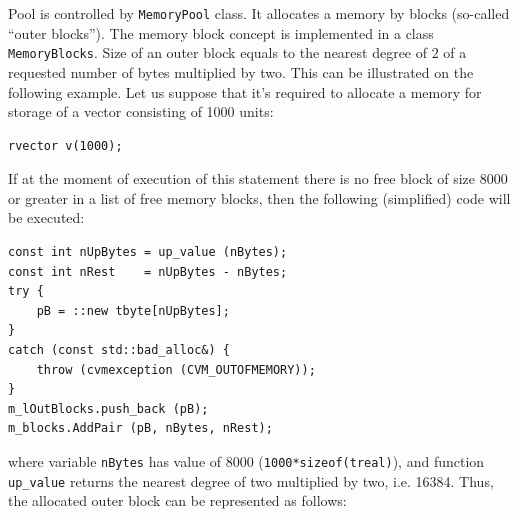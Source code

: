 Pool is controlled by \verb"MemoryPool" class. It allocates a memory
by blocks (so-called ``outer blocks'').
The memory block concept is implemented in a class
\verb"MemoryBlocks". Size of an outer block equals to the nearest
degree of $2$ of a requested number of bytes multiplied by two. This
can be illustrated on the following example. Let us suppose that it's
required to allocate a memory for storage of a vector consisting
of 1000 units:
\begin{Verbatim}
rvector v(1000);
\end{Verbatim}
If at the moment of execution of this statement there is no free
block of size 8000 or greater in a list of free memory blocks, then
the following (simplified) code will be executed:
\begin{Verbatim}
const int nUpBytes = up_value (nBytes);
const int nRest    = nUpBytes - nBytes;
try {
    pB = ::new tbyte[nUpBytes];
}
catch (const std::bad_alloc&) {
    throw (cvmexception (CVM_OUTOFMEMORY));
}
m_lOutBlocks.push_back (pB);
m_blocks.AddPair (pB, nBytes, nRest);
\end{Verbatim}
where variable \verb"nBytes" has value of 8000
(\verb"1000*sizeof(treal)"), and function \verb"up_value" returns
the nearest degree of two multiplied by two, i.e. 16384. Thus, the
allocated outer block can be represented as follows:

